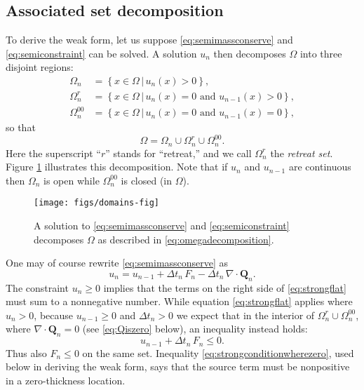 \documentclass[final,onefignum]{siamart190516}
\newcommand\bQ{\mathbf{Q}}
\newcommand{\Div}{\nabla\cdot}
\begin{document}
\subsection{Associated set decomposition}  \label{subsec:setdecompose}  To derive the weak form, let us suppose \eqref{eq:semimassconserve} and \eqref{eq:semiconstraint} can be solved.  A solution $u_n$ then decomposes $\Omega$ into three disjoint regions:
\begin{align*}
\Omega_n &= \left\{x \in \Omega \,\big|\, u_n(x)>0\right\}, \\
\Omega_n^r &= \left\{x \in \Omega \,\big|\, u_n(x)=0 \text{ and } u_{n-1}(x) > 0\right\}, \\
\Omega_n^{00} &= \left\{x \in \Omega \,\big|\, u_n(x)=0 \text{ and } u_{n-1}(x) = 0\right\},
\end{align*}
so that
\begin{equation}
\Omega = \Omega_n \cup \Omega_n^r \cup \Omega_n^{00}.  \label{eq:omegadecomposition}
\end{equation}
Here the superscript ``$r$'' stands for ``retreat,'' and we call $\Omega_n^r$ the \emph{retreat set}.  Figure \ref{fig:domains} illustrates this decomposition.  Note that if $u_n$ and $u_{n-1}$ are continuous then $\Omega_n$ is open while $\Omega_n^{00}$ is closed (in $\Omega$).

\begin{figure}[ht]
\medskip
\begin{center}
\texttt{[image: figs/domains-fig]}
\end{center}
\caption{A solution to \eqref{eq:semimassconserve} and \eqref{eq:semiconstraint} decomposes $\Omega$ as described in \eqref{eq:omegadecomposition}.}
\label{fig:domains}
\end{figure}

One may of course rewrite \eqref{eq:semimassconserve} as
\begin{equation}
u_n = u_{n-1} + \Delta t_n\, F_n - \Delta t_n\, \Div \bQ_n.  \label{eq:strongflat}
\end{equation}
The constraint $u_n \ge 0$ implies that the terms on the right side of \eqref{eq:strongflat} must sum to a nonnegative number.  While equation \eqref{eq:strongflat} applies where $u_n>0$, because $u_{n-1}\ge 0$ and $\Delta t_n > 0$ we expect that in the interior of $\Omega_n^r \cup \Omega_n^{00}$, where $\Div \bQ_n=0$ (see \eqref{eq:Qiszero} below), an inequality instead holds:
\begin{equation}
u_{n-1} + \Delta t_n\, F_n \le 0. \label{eq:strongconditionwherezero}
\end{equation}
Thus also $F_n \le 0$ on the same set.  Inequality \eqref{eq:strongconditionwherezero}, used below in deriving the weak form, says that the source term must be nonpositive in a zero-thickness location.
\end{document}
